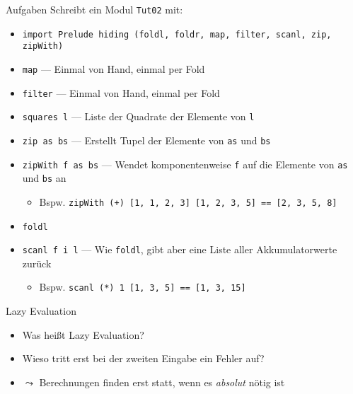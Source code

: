 \documentclass{beamer}
\begin{document}
\begin{frame}{Aufgaben}
	Schreibt ein Modul \texttt{Tut02} mit:

	\begin{itemize}
		\item \texttt{import Prelude hiding (foldl, foldr, map, filter, scanl, zip, zipWith)}
		\item \texttt{map} --- Einmal von Hand, einmal per Fold
		\item \texttt{filter} --- Einmal von Hand, einmal per Fold
		\item \texttt{squares l} --- Liste der Quadrate der Elemente von \texttt{l}
		\item \texttt{zip as bs} --- Erstellt Tupel der Elemente von \texttt{as} und \texttt{bs}
		\item \texttt{zipWith f as bs} --- Wendet komponentenweise \texttt{f} auf die Elemente von \texttt{as} und \texttt{bs} an
		\begin{itemize}
			\item Bspw. \texttt{zipWith (+) [1, 1, 2, 3] [1, 2, 3, 5] == [2, 3, 5, 8]}
		\end{itemize}
   		\pause
		\item \texttt{foldl}
		\item \texttt{scanl f i l} --- Wie \texttt{foldl}, gibt aber eine Liste aller Akkumulatorwerte zurück
		\begin{itemize}
			\item Bspw. \texttt{scanl (*) 1 [1, 3, 5] == [1, 3, 15]}
		\end{itemize}
	\end{itemize}
\end{frame}

\begin{frame}{Lazy Evaluation}

	\begin{itemize}
		\item Was heißt Lazy Evaluation?
		\item Wieso tritt erst bei der zweiten Eingabe ein Fehler auf?
		\pause
		\item $\leadsto$ Berechnungen finden erst statt, wenn es \emph{absolut} nötig ist
	\end{itemize}
\end{frame}
\end{document}
